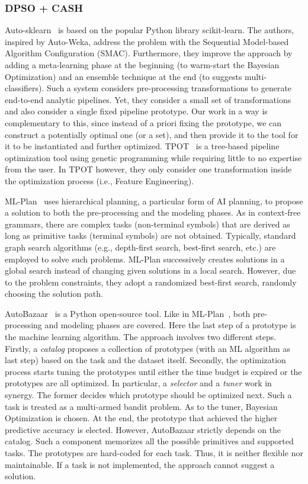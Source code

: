 \subsubsection{DPSO + CASH}
Auto-sklearn~\cite{Feurer15AutoSklearn} is based on the popular Python library scikit-learn.
The authors, inspired by Auto-Weka, address the problem with the Sequential Model-based Algorithm Configuration (SMAC).
Furthermore, they improve the approach by adding a meta-learning phase at the beginning (to warm-start the Bayesian Optimization) and an ensemble technique at the end (to suggests multi-classifiers).
Such a system considers pre-processing transformations to generate end-to-end analytic pipelines. 
Yet, they consider a small set of transformations and also consider a single fixed pipeline prototype. 
Our work in a way is complementary to this, since instead of a priori fixing the prototype, we can construct a potentially optimal one (or a set), and then provide it to the tool for it to be instantiated and further optimized.
TPOT~\cite{Olson16Tpot} is a tree-based pipeline optimization tool using genetic programming while requiring little to no expertise from the user. In TPOT however, they only consider one transformation inside the optimization process (i.e., Feature Engineering).


ML-Plan~\cite{mohr2018ml} uses hierarchical planning, a particular form of AI planning, to propose a solution to both the pre-processing and the modeling phases. 
As in context-free grammars, there are complex tasks (non-terminal symbols) that are derived as long as primitive tasks (terminal symbols) are not obtained.
Typically, standard graph search algorithms (e.g., depth-first search, best-first search, etc.) are employed to solve such problems.
ML-Plan successively creates solutions in a global search instead of changing given solutions in a local search. However, due to the problem constraints, they adopt a randomized best-first search, randomly choosing the solution path.

AutoBazaar~\cite{AutoBazaar} is a Python open-source tool.
Like in ML-Plan~\cite{mohr2018ml}, both pre-processing and modeling phases are covered.
Here the last step of a prototype is the machine learning algorithm.
The approach involves two different steps.
Firstly, a \textit{catalog} proposes a collection of prototypes (with an ML algorithm as last step) based on the task and the dataset itself.
Secondly, the optimization process starts tuning the prototypes until either the time budget is expired or the prototypes are all optimized.
In particular, a \textit{selector} and a \textit{tuner} work in synergy.
The former decides which prototype should be optimized next.
Such a task is treated as a multi-armed bandit problem.
As to the tuner, Bayesian Optimization is chosen.
At the end, the prototype that achieved the higher predictive accuracy is elected.
However, AutoBazaar strictly depends on the catalog.
Such a component memorizes all the possible primitives and supported tasks.
The prototypes are hard-coded for each task.
Thus, it is neither flexible nor maintainable.
If a task is not implemented, the approach cannot suggest a solution.

